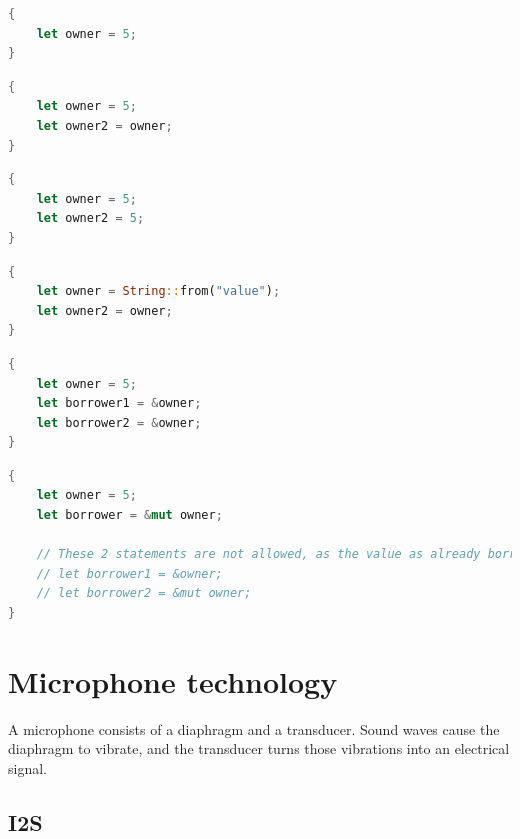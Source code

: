 \begin{lstlisting}[style=colorEX,language=Rust,caption={Simple example of a value and it's owner},label={code:owner}]
{
    let owner = 5;
}
\end{lstlisting}


\begin{lstlisting}[style=colorEX,language=Rust,caption={Simple example of a copy},label={code:copy}]
{
    let owner = 5;
    let owner2 = owner;
}
\end{lstlisting}

\begin{lstlisting}[style=colorEX,language=Rust,caption={Simple example of two owners},label={code:two_owners}]
{
    let owner = 5;
    let owner2 = 5;
}
\end{lstlisting}

\begin{lstlisting}[style=colorEX,language=Rust,caption={Simple example of a move},label={code:move}]
{
    let owner = String::from("value");
    let owner2 = owner;
}
\end{lstlisting}

\begin{lstlisting}[style=colorEX,language=Rust,caption={Simple example of a immutable borrow},label={code:borrow}]
{
    let owner = 5;
    let borrower1 = &owner;
    let borrower2 = &owner;
}
\end{lstlisting}

\begin{lstlisting}[style=colorEX,language=Rust,caption={Simple example of a mutable borrow},label={code:mut_borrow}]
{
    let owner = 5;
    let borrower = &mut owner;

    // These 2 statements are not allowed, as the value as already borrowed as mutable.
    // let borrower1 = &owner;
    // let borrower2 = &mut owner;
}
\end{lstlisting}




\section{Microphone technology}

A microphone consists of a diaphragm and a transducer.
Sound waves cause the diaphragm to vibrate, and
the transducer turns those vibrations into an electrical signal.

\subsection{I2S}

